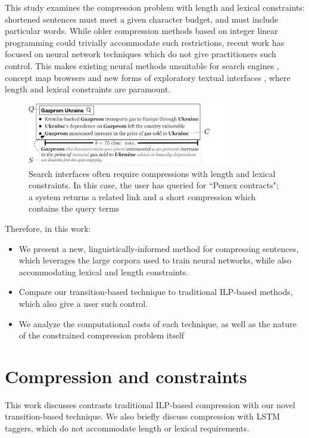 \documentclass[11pt,a4paper]{article}
\begin{document}
This study examines the compression problem with length and lexical constraints: shortened sentences must meet a given character budget, and must include particular words. While older compression methods based on integer linear programming could trivially accommodate such restrictions, recent work has focused on neural network techniques \cite{filippova2015sentence} which do not give practitioners such control. This makes existing neural methods unsuitable for search engines \cite{hearst2009search}, concept map browsers \cite{falke2017graphdocexplore} and new forms of exploratory textual interfaces \cite{marchionini2006exploratory}, where length and lexical constraints are paramount. 

\begin{figure}[htb!]
\includegraphics[width=9cm]{qf.pdf}
\caption{Search interfaces often require compressions with length and lexical constraints. In this case, the user has queried for ``Pemex contracts"; a system returns a related link and a short compression which contains the query terms}
\label{f:qf}
\end{figure}


Therefore, in this work:

\begin{itemize}
\item{We present a new, linguistically-informed method for compressing sentences, which leverages the large corpora used to train neural networks, while also accommodating lexical and length constraints.}
\item{Compare our transition-based technique to traditional ILP-based methods, which also give a user such control.}
\item{We analyze the computational costs of each technique, as well as the nature of the constrained compression problem itself}
\end{itemize}


\section{Compression and constraints}

This work discusses contrasts traditional ILP-based compression with our novel transition-based technique. We also briefly discuss compression with LSTM taggers, which do not accommodate length or lexical requirements.
\end{document}
